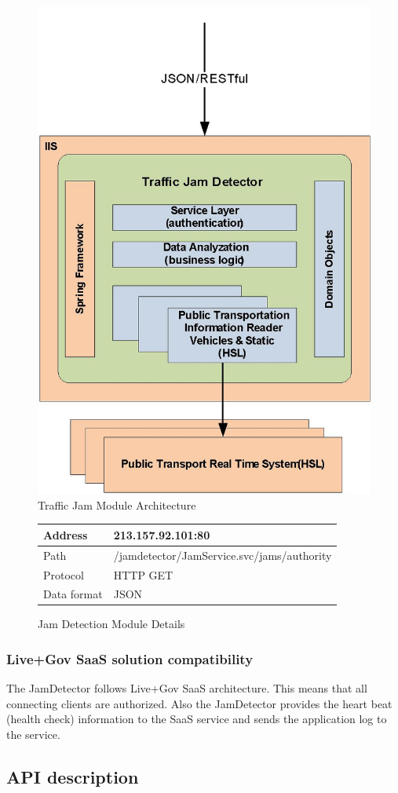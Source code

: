 \begin{figure}
\centering
\includegraphics[width=0.5 \textwidth]{img/tjd/architecture.jpg}
\caption{Traffic Jam Module Architecture}\label{fig:tjd_architecture}
\end{figure}

\begin{figure}
\centering
\begin{tabular}{|l|l|}
\hline
Address     & 213.157.92.101:80 \\ \hline
Path        & /jamdetector/JamService.svc/jams/{authority} \\ \hline
Protocol    & HTTP GET \\ \hline
Data format & JSON \\ \hline
\end{tabular}
\caption{Jam Detection Module Details}
\end{figure}

\subsubsection*{\bf Live+Gov SaaS solution compatibility}

The JamDetector follows Live+Gov SaaS architecture. This means that
all connecting clients are authorized. Also the JamDetector provides
the heart beat (health check) information to the SaaS service and
sends the application log to the service.  

\subsection*{API description}

